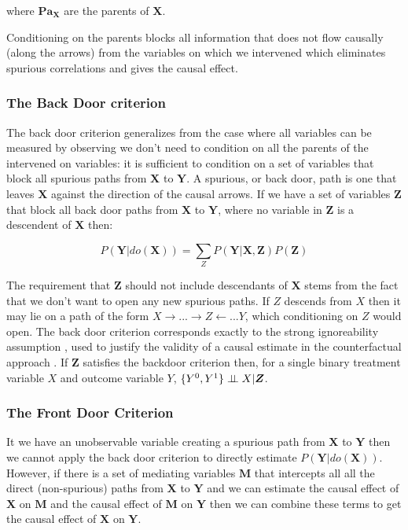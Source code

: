 \documentclass[11pt,a4paper]{article}
\begin{document}
where $\boldsymbol{Pa_{X}}$ are the parents of $\boldsymbol{X}$.


Conditioning on the parents blocks all information that does not flow causally (along the arrows) from the variables on which we intervened which eliminates spurious correlations and gives the causal effect. 

\subsubsection{The Back Door criterion}
The back door criterion generalizes from the case where all variables can be measured by observing we don't need to condition on all the parents of the intervened on variables: it is sufficient to condition on a set of variables that block all spurious paths from $\boldsymbol{X}$ to $\boldsymbol{Y}$. A spurious, or back door, path is one that leaves $\boldsymbol{X}$ against the direction of the causal arrows. If we have a set of variables $\boldsymbol{Z}$ that block all back door paths from $\boldsymbol{X}$ to $\boldsymbol{Y}$, where no variable in $\boldsymbol{Z}$ is a descendent of $\boldsymbol{X}$ then:

\begin{equation}
P(\boldsymbol{Y}|do(\boldsymbol{X})) = \sum_{Z}{P(\boldsymbol{Y}|\boldsymbol{X},\boldsymbol{Z})P(\boldsymbol{Z})}
\end{equation}

The requirement that $\boldsymbol{Z}$ should not include descendants of $\boldsymbol{X}$ stems from the fact that we don't want to open any new spurious paths. If $Z$ descends from $X$ then it may lie on a path of the form $X \rightarrow...\rightarrow Z \leftarrow... Y$, which conditioning on $Z$ would open. The back door criterion corresponds exactly to the strong ignoreability assumption \cite{Rosenbaum1983}, used to justify the validity of a causal estimate in the counterfactual approach . If $\boldsymbol{Z}$ satisfies the backdoor criterion then, for a single binary treatment variable $X$ and outcome variable $Y$, $\{Y^{0},Y^{1}\} \perp\!\!\!\perp X | \boldsymbol{Z}$. 
 
\subsubsection{The Front Door Criterion}
It we have an unobservable variable creating a spurious path from $\boldsymbol{X}$ to $\boldsymbol{Y}$ then we cannot apply the back door criterion to directly estimate $P(\boldsymbol{Y}|do(\boldsymbol{X}))$. However, if there is a set of mediating variables $\boldsymbol{M}$ that intercepts all all the direct (non-spurious) paths from $\boldsymbol{X}$ to $\boldsymbol{Y}$ and we can estimate the causal effect of $\boldsymbol{X}$ on $\boldsymbol{M}$ and the causal effect of $\boldsymbol{M}$ on $\boldsymbol{Y}$ then we can combine these terms to get the causal effect of $\boldsymbol{X}$ on $\boldsymbol{Y}$. 
\end{document}
